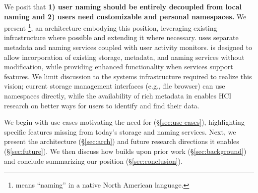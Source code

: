 We posit that \textbf{1) user naming should be entirely decoupled from local naming and 2) users need customizable and personal namespaces.}
We present \system\footnote{\system means ``naming'' in a native North American language.}, an architecture embodying this position, leveraging existing infrastructure where possible and extending it where necessary.
\system uses separate metadata and naming services coupled with user activity monitors.
\system is designed to allow incorporation of existing storage, metadata, and naming services without modification, while providing enhanced functionality when services support \system features.
We limit discussion to the systems infrastructure required to realize this vision; current storage management interfaces (e.g., file browser) can use \system namespaces directly, while the availability of rich metadata in \system enables HCI research on better ways for users to identify and find their data.

We begin with use cases motivating the need for \system (\S\ref{sec:use-cases}), highlighting specific features missing from today's storage and naming services. Next, we present the \system architecture (\S\ref{sec:arch}) and future research directions it enables (\S\ref{sec:future}).
We then discuss how \system builds upon prior work
(\S\ref{sec:background}) and conclude summarizing our position (\S\ref{sec:conclusion}).
